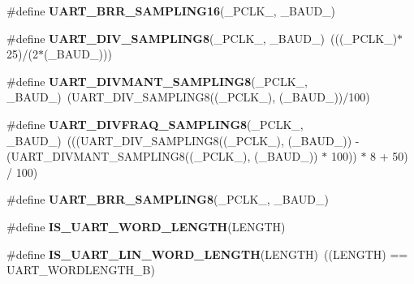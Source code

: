 \begin{DoxyCompactItemize}
\item 
\#define {\bfseries U\-A\-R\-T\-\_\-\-B\-R\-R\-\_\-\-S\-A\-M\-P\-L\-I\-N\-G16}(\-\_\-\-P\-C\-L\-K\-\_\-, \-\_\-\-B\-A\-U\-D\-\_\-)
\item 
\hypertarget{group___u_a_r_t___private___macros_ga97075bc06a62c182b0b9a00bbf04b170}{\#define {\bfseries U\-A\-R\-T\-\_\-\-D\-I\-V\-\_\-\-S\-A\-M\-P\-L\-I\-N\-G8}(\-\_\-\-P\-C\-L\-K\-\_\-, \-\_\-\-B\-A\-U\-D\-\_\-)~(((\-\_\-\-P\-C\-L\-K\-\_\-)$\ast$25)/(2$\ast$(\-\_\-\-B\-A\-U\-D\-\_\-)))}\label{group___u_a_r_t___private___macros_ga97075bc06a62c182b0b9a00bbf04b170}

\item 
\hypertarget{group___u_a_r_t___private___macros_ga3dafeed17fc4cf319b0dd88d7d0fb614}{\#define {\bfseries U\-A\-R\-T\-\_\-\-D\-I\-V\-M\-A\-N\-T\-\_\-\-S\-A\-M\-P\-L\-I\-N\-G8}(\-\_\-\-P\-C\-L\-K\-\_\-, \-\_\-\-B\-A\-U\-D\-\_\-)~(U\-A\-R\-T\-\_\-\-D\-I\-V\-\_\-\-S\-A\-M\-P\-L\-I\-N\-G8((\-\_\-\-P\-C\-L\-K\-\_\-), (\-\_\-\-B\-A\-U\-D\-\_\-))/100)}\label{group___u_a_r_t___private___macros_ga3dafeed17fc4cf319b0dd88d7d0fb614}

\item 
\hypertarget{group___u_a_r_t___private___macros_gae0c8a28dbc006a93dd8e90e8ff8a37a0}{\#define {\bfseries U\-A\-R\-T\-\_\-\-D\-I\-V\-F\-R\-A\-Q\-\_\-\-S\-A\-M\-P\-L\-I\-N\-G8}(\-\_\-\-P\-C\-L\-K\-\_\-, \-\_\-\-B\-A\-U\-D\-\_\-)~(((U\-A\-R\-T\-\_\-\-D\-I\-V\-\_\-\-S\-A\-M\-P\-L\-I\-N\-G8((\-\_\-\-P\-C\-L\-K\-\_\-), (\-\_\-\-B\-A\-U\-D\-\_\-)) -\/ (U\-A\-R\-T\-\_\-\-D\-I\-V\-M\-A\-N\-T\-\_\-\-S\-A\-M\-P\-L\-I\-N\-G8((\-\_\-\-P\-C\-L\-K\-\_\-), (\-\_\-\-B\-A\-U\-D\-\_\-)) $\ast$ 100)) $\ast$ 8 + 50) / 100)}\label{group___u_a_r_t___private___macros_gae0c8a28dbc006a93dd8e90e8ff8a37a0}

\item 
\#define {\bfseries U\-A\-R\-T\-\_\-\-B\-R\-R\-\_\-\-S\-A\-M\-P\-L\-I\-N\-G8}(\-\_\-\-P\-C\-L\-K\-\_\-, \-\_\-\-B\-A\-U\-D\-\_\-)
\item 
\#define {\bfseries I\-S\-\_\-\-U\-A\-R\-T\-\_\-\-W\-O\-R\-D\-\_\-\-L\-E\-N\-G\-T\-H}(L\-E\-N\-G\-T\-H)
\item 
\hypertarget{group___u_a_r_t___private___macros_ga12e732e82119829947fb0c97da82bd69}{\#define {\bfseries I\-S\-\_\-\-U\-A\-R\-T\-\_\-\-L\-I\-N\-\_\-\-W\-O\-R\-D\-\_\-\-L\-E\-N\-G\-T\-H}(L\-E\-N\-G\-T\-H)~((L\-E\-N\-G\-T\-H) == U\-A\-R\-T\-\_\-\-W\-O\-R\-D\-L\-E\-N\-G\-T\-H\-\_\-B)}\label{group___u_a_r_t___private___macros_ga12e732e82119829947fb0c97da82bd69}


\end{DoxyCompactItemize}
